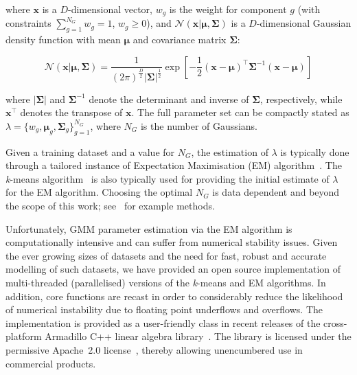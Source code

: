\documentclass[10pt,a4paper]{article}
\def\Vec#1{{\boldsymbol{#1}}}
\def\Mat#1{{\boldsymbol{#1}}}
\begin{document}
where $\Vec{x}$ is a $D$-dimensional vector,
$w_g$ is the weight for component $g$ (with constraints $\sum\nolimits_{g=1}^{N_G} w_g = 1$, $w_g \geq 0$),
and
${{\mathcal{N}}}( \Vec{x} | \Vec{\mu}, \Mat{\Sigma})$ is a $D$-dimensional Gaussian density function with mean $\Vec{\mu}$ and covariance matrix $\Mat{\Sigma}$:

\begin{equation}
  {{\mathcal{N}}}( \Vec{x} | \Vec{\mu}, \Mat{\Sigma} )  = 
  \frac{1}{ (2\pi)^{\frac{D}{2}} | \Mat{\Sigma}|^{\frac{1}{2}} }
  \exp \left[ -\frac{1}{2} (\Vec{x}-\Vec{\mu})^\top \Mat{\Sigma}^{-1} (\Vec{x}-\Vec{\mu}) \right]
  \label{eqn:gaussian}
\end{equation}%

where $|\Mat{\Sigma}|$ and $\Mat{\Sigma}^{-1}$ denote the determinant and inverse of $\Mat{\Sigma}$, respectively,
while $\Vec{x}^\top$ denotes the transpose of $\Vec{x}$.
The full parameter set can be compactly stated as {\small $\lambda = \{ w_g, \Vec{\mu}_g, \Mat{\Sigma}_g \}_{g=1}^{N_G}$},
where $N_G$ is the number of Gaussians.

Given a training dataset and a value for $N_G$,
the estimation of $\lambda$ is typically done through a
tailored instance of Expectation Maximisation (EM) algorithm~\cite{Dempster77, McLachlan-2008, Moon96, Redner84}.
The {\it k}-means algorithm~\cite{Bishop_2006,Duda01,Linde80} is also typically used for providing the initial estimate of $\lambda$ for the EM algorithm.
Choosing the optimal $N_G$ is data dependent and beyond the scope of this work; see~\cite{Hamerly_2003,Pelleg_2000} for example methods.

Unfortunately, GMM parameter estimation via the EM algorithm is computationally intensive
and can suffer from numerical stability issues.
Given the ever growing sizes of datasets and the need for fast, robust and accurate modelling of such datasets,
we have provided an open source implementation of multi-threaded (parallelised) versions 
of the \mbox{{\it k}-means} and EM algorithms.
In addition, core functions are recast in order to considerably reduce the likelihood of numerical instability due to floating point underflows and overflows.
The implementation is provided as a user-friendly class in recent releases of the cross-platform Armadillo C++ linear algebra library~\cite{Armadillo_JOSS_2016,Armadillo_PASC_2017}.
The library is licensed under the permissive Apache~2.0 license~\cite{Laurent_2008},
thereby allowing unencumbered use in commercial products.
\end{document}
